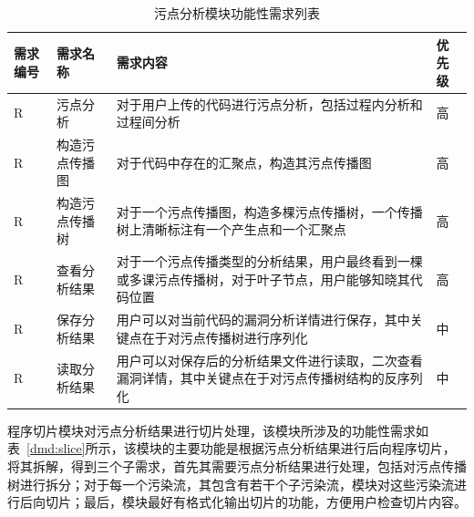 \begin{table}[!htbp]\footnotesize %
	\centering
	\caption{污点分析模块功能性需求列表}
	\vspace{2mm}
	\begin{tabular}{L{1.3cm}L{2.5cm}L{6.8cm}L{1.5cm}}
		\toprule
		\textbf{需求编号}&\textbf{需求名称}&\textbf{需求内容}&\textbf{优先级}\\
		\midrule
		R	& 污点分析 				& 对于用户上传的代码进行污点分析，包括过程内分析和过程间分析 & 高 \\
		R  & 构造污点传播图 	 & 对于代码中存在的汇聚点，构造其污点传播图 & 高 \\
		R  & 构造污点传播树	 & 对于一个污点传播图，构造多棵污点传播树，一个传播树上清晰标注有一个产生点和一个汇聚点 & 高 \\
		R  & 查看分析结果	 & 对于一个污点传播类型的分析结果，用户最终看到一棵或多课污点传播树，对于叶子节点，用户能够知晓其代码位置 & 高 \\
		R  & 保存分析结果	   &用户可以对当前代码的漏洞分析详情进行保存，其中关键点在于对污点传播树进行序列化 & 中 \\
		R  & 读取分析结果 	   &用户可以对保存后的分析结果文件进行读取，二次查看漏洞详情，其中关键点在于对污点传播树结构的反序列化 & 中 \\
		\bottomrule
	\end{tabular}
	\label{dmd:taint}
\end{table}

程序切片模块对污点分析结果进行切片处理，该模块所涉及的功能性需求如表~\ref{dmd:slice}所示，该模块的主要功能是根据污点分析结果进行后向程序切片，将其拆解，得到三个子需求，首先其需要污点分析结果进行处理，包括对污点传播树进行拆分；对于每一个污染流，其包含有若干个子污染流，模块对这些污染流进行后向切片；最后，模块最好有格式化输出切片的功能，方便用户检查切片内容。


